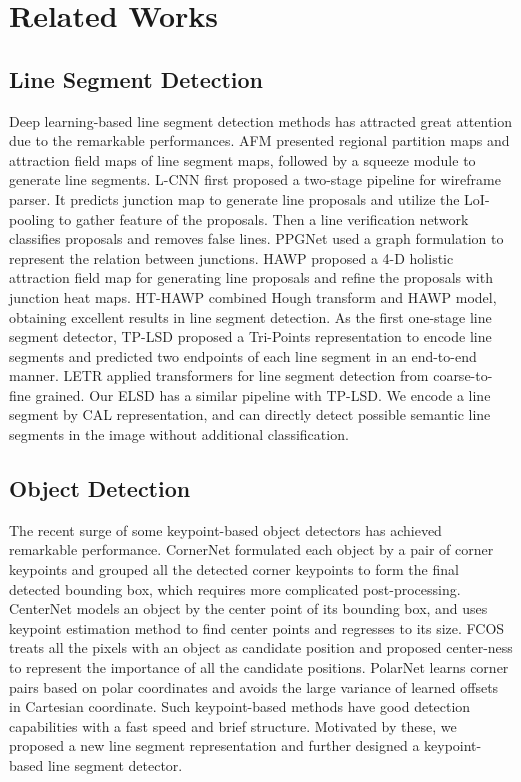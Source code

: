 \documentclass[10pt,twocolumn,letterpaper]{article}
\begin{document}
\section{Related Works}
\subsection{Line Segment Detection}
Deep learning-based line segment detection methods has attracted great attention due to the remarkable performances\cite{wireframe_cvpr18,TP-LSD,HAWP,LCNN,3Dwireframe}. 
AFM\cite{AFM} presented regional partition maps and attraction field maps of line segment maps, followed by a squeeze module to generate line segments. L-CNN\cite{LCNN} first proposed a two-stage pipeline for wireframe parser. It predicts junction map to generate line proposals and utilize the LoI-pooling to gather feature of the proposals. Then a line verification network classifies proposals and removes false lines. PPGNet\cite{PPGNET} used a graph formulation to represent the relation between junctions. HAWP\cite{HAWP} proposed a 4-D holistic attraction field map for generating line proposals and refine the proposals with junction heat maps. HT-HAWP\cite{HT-HAWP} combined Hough transform and HAWP model, obtaining excellent results in line segment detection. As the first one-stage line segment detector, TP-LSD\cite{TP-LSD} proposed a Tri-Points representation to encode line segments and predicted two endpoints of each line segment in an end-to-end manner. LETR\cite{LETR} applied transformers for line segment detection from coarse-to-fine grained. Our ELSD has a similar pipeline with TP-LSD. We encode a line segment by CAL representation, and can directly detect possible semantic line segments in the image without additional classification.

\subsection{Object Detection}
The recent surge of some keypoint-based object detectors has achieved remarkable performance. CornerNet\cite{CornerNet} formulated each object by a pair of corner keypoints and grouped all the detected corner keypoints to form the final detected bounding box, which requires more complicated post-processing.
CenterNet\cite{Centernet} models an object by the center point of its bounding box, and uses keypoint estimation method to find center points and regresses to its size. FCOS\cite{FCOS}  treats all the pixels with an object as candidate position and proposed center-ness to represent the importance of all the candidate positions. PolarNet\cite{polarnet} learns corner pairs based on polar coordinates and avoids the large variance of learned offsets in Cartesian coordinate. Such keypoint-based methods have good detection capabilities with a  fast speed and brief structure. Motivated by these, we proposed a new line segment representation and further designed a keypoint-based line segment detector.  
\end{document}
